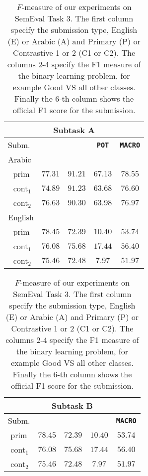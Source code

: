   \begin{table}[h]
 \begin{tabular}{|l|cccc|}
  \multicolumn{5}{c}{Subtask A} \\
  \hline
 Subm.		& \bf \good & \bf\bad 	& \bf \texttt{POT} & \bf\texttt{MACRO}	
 \\
  \hline
  Arabic&&&&\\
  \,\,\,\,prim	& $77.31$ & $91.21$	& $67.13$	& $78.55$ \\
  \,\,\,\,cont$_1$	& $74.89$ & $91.23$	& $63.68$	& $76.60$ \\
  \,\,\,\,cont$_2$	& $76.63$ & $90.30$	& $63.98$	& $76.97$ \\
  
  English \\
  \,\,\,\,prim  & $78.45$	& $72.39$	& $10.40$	& $53.74$ \\
  \,\,\,\,cont$_1$ & $76.08$	& $75.68$	& $17.44$	& $56.40$ \\
  \,\,\,\,cont$_2$ & $75.46$	& $72.48$ 	& $7.97$	& $51.97$ \\
\hline 
\end{tabular}
\begin{tabular}{|l|cccc|}
\hline
  \multicolumn{5}{c}{Subtask B} \\
\hline  
 Subm.		& \bf \yes & \bf \no & \bf \unsure & \bf \texttt{MACRO}	 \\
  \hline
  
  \,\,prim	& $78.45$	& $72.39$	& $10.40$	& $53.74$ \\
  \,\,cont$_1$& $76.08$	& $75.68$	& $17.44$	& $56.40$ \\
  \,\,cont$_2$ & $75.46$	& $72.48$ 	& $7.97$	& $51.97$ \\
 \end{tabular}
\caption{$F$-measure of our experiments on SemEval Task 3. The first 
column specify the submission type, English (E) or Arabic (A) and Primary (P) 
or Contrastive 1 or 2 (C1 or C2). The columns 2-4 specify the F1 measure of the 
binary learning problem, for example Good VS all other classes. Finally the 
6-th column shows the official F1 score for the submission.\label{tab:results}}
\end{table}

% 
% 

